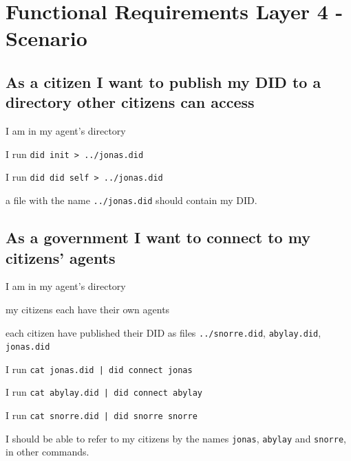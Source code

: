 \newpage



\section{Functional Requirements Layer 4 - Scenario}



\subsection{As a citizen I want to publish my DID to a directory other citizens can access}
\begin{description}[1.35cm]
    \item[Given] I am in my agent's directory
    \item[When] I run \texttt{did init > ../jonas.did}
    \item[or] I run \texttt{did did self > ../jonas.did}
    \item[Then] a file with the name \texttt{../jonas.did} should contain my DID.
\end{description}



\subsection{As a government I want to connect to my citizens' agents}
\begin{description}[1.35cm]
    \item[Given] I am in my agent's directory
    \item[and] my citizens each have their own agents
    \item[and] each citizen have published their DID as files \texttt{../snorre.did}, \texttt{abylay.did}, \texttt{jonas.did}
    \item[When] I run \texttt{cat jonas.did | did connect jonas}
    \item[and] I run \texttt{cat abylay.did | did connect abylay}
    \item[and] I run \texttt{cat snorre.did | did snorre snorre}
    \item[Then] I should be able to refer to my citizens by the names \texttt{jonas}, \texttt{abylay} and \texttt{snorre}, in other commands.
\end{description}



